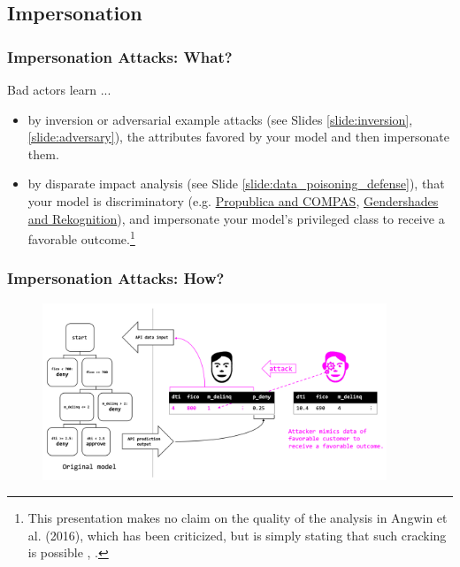 \documentclass[11pt,
               aspectratio=169,
               hyperref={colorlinks}
               ]{beamer}
\begin{document}
		\subsection{Impersonation}

			\begin{frame}
		
				\frametitle{Impersonation Attacks: \textbf{What?}}		
Bad actors learn ... 
				\begin{itemize}
					\item by inversion or adversarial example attacks (see Slides \ref{slide:inversion}, \ref{slide:adversary}), the attributes favored by your model and then impersonate them.
					\item by disparate impact analysis (see Slide \ref{slide:data_poisoning_defense}), that your model is discriminatory (e.g. \href{https://www.propublica.org/article/machine-bias-risk-assessments-in-criminal-sentencing}{Propublica and COMPAS}, \href{https://medium.com/@Joy.Buolamwini/response-racial-and-gender-bias-in-amazon-rekognition-commercial-ai-system-for-analyzing-faces-a289222eeced}{Gendershades and Rekognition}), and impersonate your model's privileged class to receive a favorable outcome.\footnote{This presentation makes no claim on the quality of the analysis in Angwin et al. (2016), which has been criticized, but is simply stating that such cracking is possible \cite{angwin16,}, \cite{flores2016false}.}
				\end{itemize}
				
			\end{frame}

			\begin{frame}
		
				\frametitle{Impersonation Attacks: \textbf{How?}}		
			
				\begin{figure}[htb]
					\begin{center}
						\includegraphics[height=150pt]{img/imperson.PNG}
					\end{center}
				\end{figure}	
				
			\end{frame}
			
\end{document}
